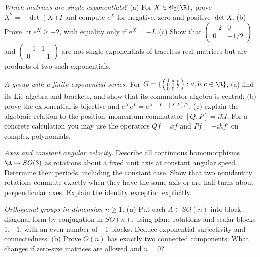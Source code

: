 \begin{exercise}[$\star\star$]\label{ex:slexp}
\emph{Which matrices are single exponentials?}
(a) For $X\in\mathfrak{sl}_2(\R)$, prove $X^2=-\det(X)I$ and
compute $e^X$ for negative, zero and positive $\det X$.
(b) Prove $\operatorname{tr}e^X\ge-2$, with equality only if $e^X=-I$.
(c) Show that $\left(\begin{smallmatrix}-2&0\\0&-1/2\end{smallmatrix}\right)$
and $\left(\begin{smallmatrix}-1&1\\0&-1\end{smallmatrix}\right)$
are not single exponentials of traceless real matrices but are products
of two such exponentials.
\end{exercise}
\begin{exercise}[$\star$]\label{ex:heisenberg}
\emph{A group with a finite exponential series.}
For $G=\{\left(\begin{smallmatrix}1&a&c\\0&1&b\\0&0&1\end{smallmatrix}\right):a,b,c\in\R\}$,
(a) find its Lie algebra and brackets, and show that its commutator
algebra is central; (b) prove the exponential is bijective and
$e^Xe^Y=e^{X+Y+[X,Y]/2}$;
(c) explain the algebraic relation to the position--momentum commutator
$[Q,P]=i\hbar I$. For a concrete calculation you may use the operators
$Qf=xf$ and $Pf=-i\hbar f'$ on complex polynomials.
\end{exercise}
\begin{exercise}[$\star$]\label{ex:oneparamso3}
\emph{Axes and constant angular velocity.}
Describe all continuous homomorphisms $\R\to SO(3)$ as rotations about
a fixed unit axis at constant angular speed. Determine their periods,
including the constant case.
Show that two nonidentity rotations commute exactly when they have the
same axis or are half-turns about perpendicular axes. Explain the identity
exception explicitly.
\end{exercise}
\begin{exercise}[$\star\star$]\label{ex:sondconnected}
\emph{Orthogonal groups in dimension $n\ge1$.}
(a) Put each $A\in SO(n)$ into block-diagonal form by conjugation in
$SO(n)$, using plane rotations and scalar blocks $1,-1$, with an even
number of $-1$ blocks. Deduce exponential surjectivity and connectedness.
(b) Prove $O(n)$ has exactly two connected components.
What changes if zero-size matrices are allowed and $n=0$?
\end{exercise}
